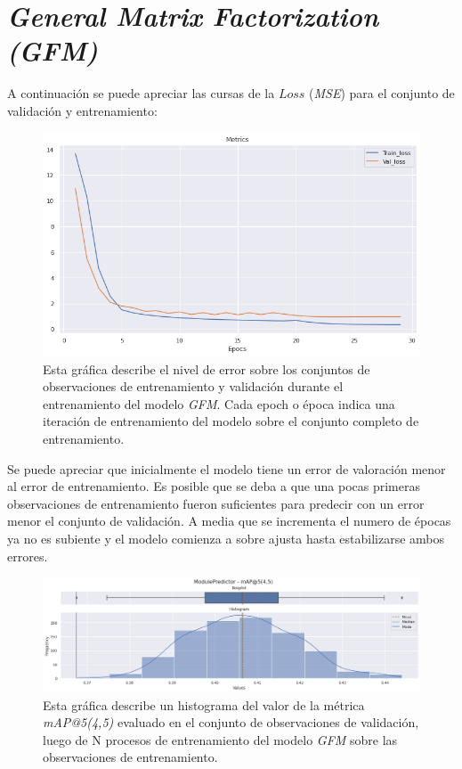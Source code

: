 \documentclass[11pt,a4paper,twoside]{thesis}
\begin{document}
{\clearpage
\section{\textit{General Matrix Factorization (GFM)}}

A continuación se puede apreciar las cursas de la $Loss$ (\textit{MSE}) para el conjunto de validación y entrenamiento:

\begin{figure}[ht]
	\centering
	\includegraphics[width=13cm]{./images/metrics-GFM-train-val-loss.png}
	\caption{Esta gráfica describe el nivel de error sobre los conjuntos de observaciones de entrenamiento y validación durante el entrenamiento del modelo \textit{GFM}. Cada epoch o época indica una iteración de entrenamiento del modelo sobre el conjunto completo de entrenamiento.}
\end{figure}

Se puede apreciar que inicialmente el modelo tiene un error de valoración menor al error de entrenamiento. Es posible que se deba a que una pocas primeras observaciones de entrenamiento fueron suficientes para predecir con un error menor el conjunto de validación. A media que se incrementa el numero de épocas ya no es subiente y el modelo comienza a sobre ajusta hasta estabilizarse ambos errores.


\clearpage

\begin{figure}[h!]
	\centering
	\includegraphics[width=15cm]{./images/metrics-GFM-mapk.png}
	\caption{Esta gráfica describe un histograma del valor de la métrica \textit{mAP@5(4,5)} evaluado en el conjunto de observaciones de validación, luego de N procesos de entrenamiento del modelo \textit{GFM} sobre las observaciones de entrenamiento.}
\end{figure}

}
\end{document}

